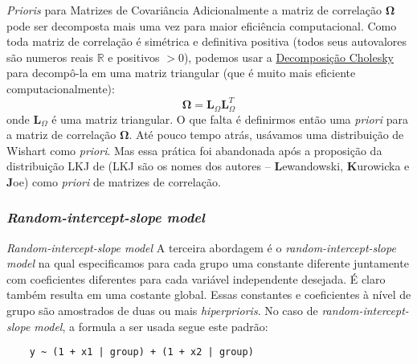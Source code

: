 \begin{frame}{\textit{Prioris} para Matrizes de Covariância}
	\small
	Adicionalmente a matriz de correlação $\boldsymbol{\Omega}$
	pode ser decomposta mais uma vez para maior eficiência computacional.
	Como toda matriz de correlação é simétrica e definitiva positiva
	(todos seus autovalores são numeros reais $\mathbb{R}$ e positivos $>0$),
	podemos usar a \href{https://en.wikipedia.org/wiki/Cholesky_decomposition}{Decomposição
		Cholesky} para decompô-la em uma matriz triangular
	(que é muito mais eficiente computacionalmente):
	$$
		\boldsymbol{\Omega} = \mathbf{L}_\Omega \mathbf{L}^T_\Omega
	$$
	onde $\mathbf{L}_\Omega$ é uma matriz triangular.
	\vfill
	O que falta é definirmos então uma \textit{priori} para a matriz de correlação
	$\boldsymbol{\Omega}$. Até pouco tempo atrás, usávamos uma distribuição de
	Wishart como \textit{priori}\parencite{gelman2013bayesian}. Mas essa prática foi
	abandonada após a proposição da distribuição LKJ de \textcite{lewandowski2009generating}
	(LKJ são os nomes dos autores -- \textbf{L}ewandowski, \textbf{K}urowicka e \textbf{J}oe)
	como \textit{priori} de matrizes de correlação.
\end{frame}

\subsubsection{\textit{Random-intercept-slope model}}
\begin{frame}[fragile]{\textit{Random-intercept-slope model}}
	A terceira abordagem é o \textit{random-intercept-slope model} na qual
	especificamos para cada grupo uma constante diferente juntamente com coeficientes
	diferentes para cada variável independente desejada.
	É claro também resulta em uma costante global.
	Essas constantes e coeficientes à nível de grupo são amostrados de
	duas ou mais \textit{hiperprioris}.
	\vfill
	No caso de \textit{random-intercept-slope model}, a formula a ser usada segue este padrão:
	\begin{lstlisting}
    y ~ (1 + x1 | group) + (1 + x2 | group)
  \end{lstlisting}
\end{frame}

